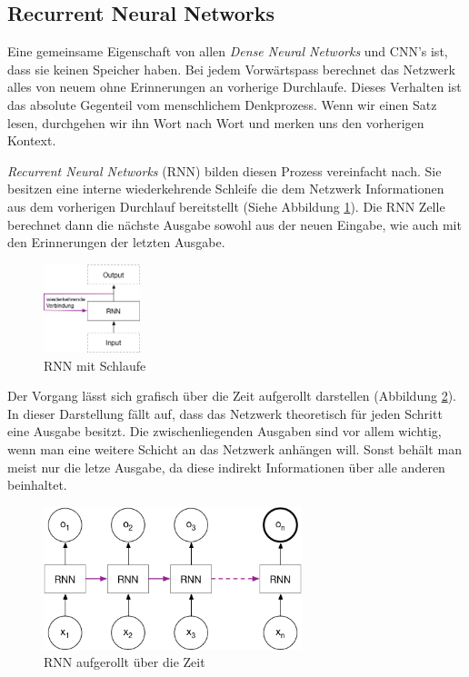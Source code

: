 \subsection{Recurrent Neural Networks}
Eine gemeinsame Eigenschaft von allen \textit{Dense Neural Networks} und CNN's ist, dass sie keinen Speicher haben. Bei jedem Vorwärtspass berechnet das Netzwerk alles von neuem ohne Erinnerungen an vorherige Durchlaufe. Dieses Verhalten ist das absolute Gegenteil vom menschlichem Denkprozess. Wenn wir einen Satz lesen, durchgehen wir ihn Wort nach Wort und merken uns den vorherigen Kontext.

\textit{Recurrent Neural Networks} (RNN) bilden diesen Prozess vereinfacht nach. Sie besitzen eine interne wiederkehrende Schleife die dem Netzwerk Informationen aus dem vorherigen Durchlauf bereitstellt (Siehe Abbildung \ref{img:rnn_loop}). Die RNN Zelle berechnet dann die nächste Ausgabe sowohl aus der neuen Eingabe, wie auch mit den Erinnerungen der letzten Ausgabe. \parencite{chollet}\\
\begin{figure}[hbt]
	\centering
		\includegraphics[width=0.25\textwidth]{assets/rnn_loop.png}
	\caption{RNN mit Schlaufe}
	\label{img:rnn_loop}
\end{figure}

Der Vorgang lässt sich grafisch über die Zeit aufgerollt darstellen (Abbildung \ref{img:rnn_unrolled}). In dieser Darstellung fällt auf, dass das Netzwerk theoretisch für jeden Schritt eine Ausgabe besitzt. Die zwischenliegenden Ausgaben sind vor allem wichtig, wenn man eine weitere Schicht an das Netzwerk anhängen will. Sonst behält man meist nur die letze Ausgabe, da diese indirekt Informationen über alle anderen beinhaltet.\\
\begin{figure}[hbt]
	\centering
		\includegraphics[width=0.67\textwidth]{assets/rnn_unrolled.png}
	\caption{RNN aufgerollt über die Zeit}
	\label{img:rnn_unrolled}
\end{figure}

